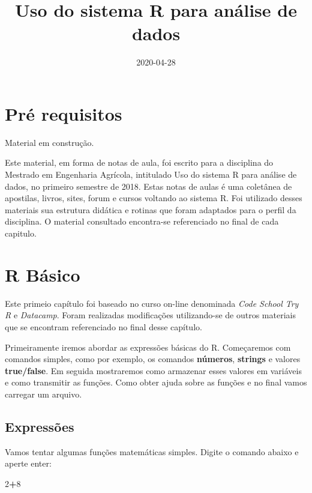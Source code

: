 \documentclass[
]{book}
\title{Uso do sistema R para análise de dados}
\author{}
\date{\vspace{-2.5em}2020-04-28}
\newenvironment{Shaded}{\begin{snugshade}}{\end{snugshade}}
\newcommand{\DecValTok}[1]{\textcolor[rgb]{0.00,0.00,0.81}{#1}}
\newcommand{\OperatorTok}[1]{\textcolor[rgb]{0.81,0.36,0.00}{\textbf{#1}}}
\begin{document}
\maketitle

{
\setcounter{tocdepth}{1}
\tableofcontents
}
\hypertarget{pruxe9-requisitos}{%
\chapter{Pré requisitos}\label{pruxe9-requisitos}}

Material em construção.

Este material, em forma de notas de aula, foi escrito para a disciplina do Mestrado em Engenharia Agrícola, intitulado Uso do sistema R para análise de dados, no primeiro semestre de 2018.
Estas notas de aulas é uma coletânea de apostilas, livros, sites, forum e cursos voltando ao sistema R. Foi utilizado desses materiais sua estrutura didática e rotinas que foram adaptados para o perfil da disciplina.
O material consultado encontra-se referenciado no final de cada capitulo.

\hypertarget{r-buxe1sico}{%
\chapter{R Básico}\label{r-buxe1sico}}

Este primeio capítulo foi baseado no curso on-line denominada \emph{Code School Try R} e \emph{Datacamp}. Foram realizadas modificações utilizando-se de outros materiais que se encontram referenciado no final desse capítulo.

Primeiramente iremos abordar as expressões básicas do R.
Começaremos com comandos simples, como por exemplo, os comandos \textbf{números}, \textbf{strings} e valores \textbf{true/false}. Em seguida mostraremos como armazenar esses valores em variáveis e como transmitir as funções. Como obter ajuda sobre as funções e no final vamos carregar um arquivo.

\hypertarget{expressuxf5es}{%
\section{Expressões}\label{expressuxf5es}}

Vamos tentar algumas funções matemáticas simples. Digite o comando abaixo e aperte enter:

\begin{Shaded}
\begin{Highlighting}[]
\DecValTok{2}\OperatorTok{+}\DecValTok{8}
\end{Highlighting}
\end{Shaded}
\end{document}
